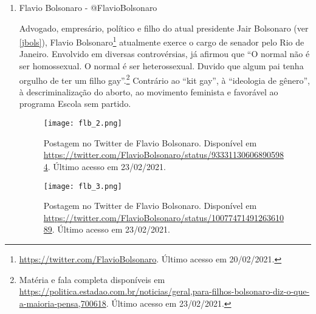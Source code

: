 \documentclass[
	12pt,				%
	openright,			%
	twoside,			%
	a4paper,			%
	english,			%
	brazil				%
	]{abntex2}
\begin{document}
\begin{anexosenv}
\begin{enumerate}
 \begin{figure}[!htbp]
    \centering
    \texttt{[image: fig\_1.png]}
    \caption{Postagem no Twitter de Filipe G. Martins. Disponível em \url{https://twitter.com/filgmartin/status/1031195934376513542}. Último acesso em 23/02/2021.}
 \end{figure}
 
 \begin{figure}[!htbp]
    \centering
    \texttt{[image: fig\_2.png]}
    \caption{Postagem no Twitter de Filipe G. Martins. Disponível em \url{https://twitter.com/filgmartin/status/1040642485196914688}. Último acesso em 23/02/2021.}
 \end{figure}
 
   \newpage

 \item Flavio Bolsonaro - @FlavioBolsonaro
 
 Advogado, empresário, político e filho do atual presidente Jair Bolsonaro (ver \ref{jbols}), Flavio Bolsonaro\footnote{\url{https://twitter.com/FlavioBolsonaro}. Último acesso em 20/02/2021.} atualmente exerce o cargo de senador pelo Rio de Janeiro. Envolvido em diversas controvérsias, já afirmou que ``O normal não é ser homossexual. O normal é ser heterossexual. Duvido que algum pai tenha orgulho de ter um filho gay''.\footnote{Matéria e fala completa disponíveis em  \url{https://politica.estadao.com.br/noticias/geral,para-filhos-bolsonaro-diz-o-que-a-maioria-pensa,700618}. Último acesso em 23/02/2021.} Contrário ao ``kit gay'', à ``ideologia de gênero'', à descriminalização do aborto, ao movimento feminista e favorável ao programa Escola sem partido.
 
 
 \begin{figure}[!htbp]
    \centering
    \texttt{[image: flb\_2.png]}
    \caption{Postagem no Twitter de Flavio Bolsonaro. Disponível em \url{https://twitter.com/FlavioBolsonaro/status/933311306068905984}. Último acesso em 23/02/2021.}
 \end{figure}
 
 \begin{figure}[!htbp]
    \centering
    \texttt{[image: flb\_3.png]}
    \caption{Postagem no Twitter de Flavio Bolsonaro. Disponível em \url{https://twitter.com/FlavioBolsonaro/status/1007747149126361089}. Último acesso em 23/02/2021.}
 \end{figure}
  

\end{enumerate}
\end{anexosenv}
\end{document}
